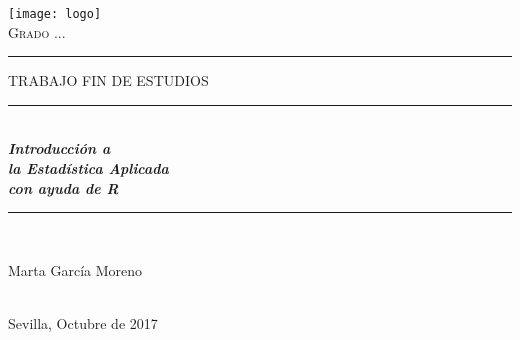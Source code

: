 \documentclass[12pt,a4paper,oneside,]{article}
\title{}
\author{}
\date{}
\numberwithin{dummy}{section}
\theoremstyle{ocrenumbox}
\theoremstyle{blacknumex}
\theoremstyle{blacknumbox}
\theoremstyle{ocrenum}
\theoremstyle{ocrenum}
\begin{document}
\begin{titlepage}

\newcommand{\HRule}{\rule{\linewidth}{0.5mm}} %

\center %


\begin{minipage}{14cm}
\center

\texttt{[image: logo]}\\[0.5cm] %


\textsc{\LARGE Grado ...}\\[2.5cm] 



\rule[1.7mm]{2cm}{0.5mm}
\hfill
\textsc{\Large TRABAJO FIN DE ESTUDIOS} 
\hfill
\rule[1.7mm]{2cm}{0.5mm} 
\\[0.75cm]

{\Huge
\textbf{\textit{
Introducción a \\[0.2cm]
la Estadística Aplicada \\[0.5cm]
con ayuda de R
}}}\\[0.75cm] 

\HRule \\[4cm]


{\Large

Marta García Moreno} \\[0.5cm]

{\large
Sevilla, Octubre de 2017
}

\end{minipage}

\vfill %

\cleardoublepage
\thispagestyle{empty}
\end{titlepage}
\end{document}
